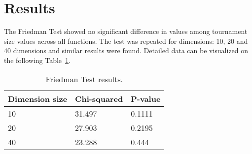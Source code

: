 \section{Results}\label{sec:results}

The Friedman Test showed no significant difference in values among tournament size values across all functions. The test was repeated for dimensions: 10, 20 and 40 dimensions and similar results were found. Detailed data can be visualized on the following Table~\ref{Friedman_test}. 

\vspace{3mm}
\begin{table}[h]
	\centering
	\begin{tabular}{|l|l|l|}
		\hline
		Dimension size      & Chi-squared        & P-value                     \\ \hline
		\multicolumn{1}{|l|}{10} & \multicolumn{1}{l|}{31.497} & \multicolumn{1}{l|}{0.1111} \\ \hline
		\multicolumn{1}{|l|}{20} & \multicolumn{1}{l|}{27.903} & \multicolumn{1}{l|}{0.2195} \\ \hline
		\multicolumn{1}{|l|}{40} & \multicolumn{1}{l|}{23.288} & \multicolumn{1}{l|}{0.444}  \\ \hline
	\end{tabular}
	\caption{Friedman Test results.}
	\label{Friedman_test}	
\end{table}


